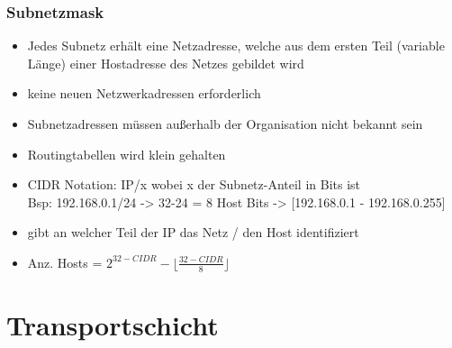 \documentclass[12pt,a4paper]{article}
\begin{document}
\subsubsection{Subnetzmask}
\begin{itemize}
\item Jedes Subnetz erhält eine Netzadresse, welche aus dem ersten Teil (variable Länge) einer Hostadresse des Netzes gebildet wird
\item keine neuen Netzwerkadressen erforderlich
\item Subnetzadressen müssen außerhalb der Organisation nicht bekannt sein
\item Routingtabellen wird klein gehalten
\item CIDR Notation: IP/x wobei x der Subnetz-Anteil in Bits ist\\
Bsp: 192.168.0.1/24 -> 32-24 = 8 Host Bits -> [192.168.0.1 - 192.168.0.255]
\item gibt an welcher Teil der IP das Netz / den Host identifiziert
\item Anz. Hosts = $2^{32-CIDR} - \lfloor \frac{32-CIDR}{8} \rfloor$
\end{itemize}

\section{Transportschicht}
\
\end{document}
